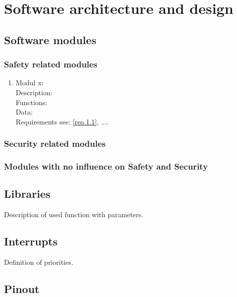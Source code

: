 \section{Software architecture and design}
\label{chapter2}

\subsection{Software modules}


\subsubsection{Safety related modules}
	\begin{enumerate}
		\item Modul x: \\
			Description:\\
			Functions:\\
			Data:\\
			Requirements see: \ref{req.1.1}, .... \\
	\end{enumerate}


\subsubsection{Security related modules}

\subsubsection{Modules with no influence on Safety and Security}

\subsection{Libraries}

Description of used function with parameters.


\subsection{Interrupts}

Definition of priorities.


\subsection{Pinout}

